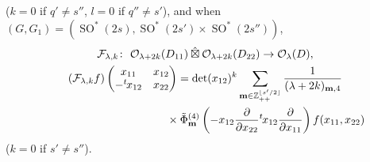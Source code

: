 \documentclass[pdftex]{sigma}
\numberwithin{equation}{section}
\newcommand{\bm}{\mathbf{m}}
\newcommand{\BZ}{\mathbb{Z}}
\newcommand{\cF}{\mathcal{F}}
\newcommand{\cO}{\mathcal{O}}
\newcommand{\hboxtimes}{\mathbin{\hat{\boxtimes}}}
\begin{document}
($k=0$ if $q'\ne s''$, $l=0$ if $q''\ne s'$), and when $(G,G_1)=(\operatorname{SO}^*(2s),\operatorname{SO}^*(2s')\times \operatorname{SO}^*(2s''))$,
\begin{gather}
\cF_{\lambda,k}\colon \ \cO_{\lambda+2k}(D_{11}) \hboxtimes \cO_{\lambda+2k}(D_{22})\to \cO_{\lambda}(D), \notag \\
(\cF_{\lambda,k}f)\begin{pmatrix}x_{11}&x_{12}\\-{}^t\hspace{-1pt}x_{12}&x_{22}\end{pmatrix}
=\det(x_{12})^k
\sum_{\bm\in\BZ_{++}^{\lfloor s'/2\rfloor}}\frac{1}{(\lambda+2k)_{\bm,4}}\notag\\
\hphantom{(\cF_{\lambda,k}f)\begin{pmatrix}x_{11}&x_{12}\\-{}^t\hspace{-1pt}x_{12}&x_{22}\end{pmatrix}=}{} \times\tilde{\Phi}_\bm^{(4)}
\left(-x_{12}\frac{\partial}{\partial x_{22}}{}^t\hspace{-1pt}x_{12}\frac{\partial}{\partial x_{11}}\right)f(x_{11},x_{22})
\label{SO*-SO*SO*}
\end{gather}
($k=0$ if $s'\ne s''$).
\end{document}

